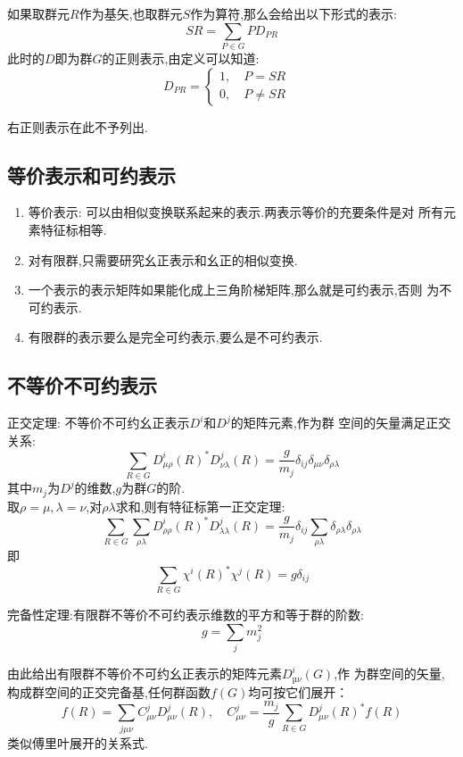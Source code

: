 \documentclass{ctexart}
\begin{document}
\noindent 如果取群元$R$作为基矢,也取群元$S$作为算符,那么会给出以下形式的表示:
\begin{equation}
    SR=\sum_{P\in G}PD_{PR}
\end{equation}
此时的$D$即为群$G$的正则表示,由定义可以知道:
\[
D_{PR}=\begin{cases}
1,\quad P=SR & \\
0,\quad P\neq SR &
\end{cases}
\]

右正则表示在此不予列出.

\subsection{等价表示和可约表示}

\begin{enumerate}
    \item 等价表示: 可以由相似变换联系起来的表示.两表示等价的充要条件是对
    所有元素特征标相等.
    \item 对有限群,只需要研究幺正表示和幺正的相似变换.
    \item 一个表示的表示矩阵如果能化成上三角阶梯矩阵,那么就是可约表示,否则
    为不可约表示.
    \item 有限群的表示要么是完全可约表示,要么是不可约表示.
\end{enumerate}

\subsection{不等价不可约表示}

\noindent 正交定理: 不等价不可约幺正表示$D^{i}$和$D^{j}$的矩阵元素,作为群
空间的矢量满足正交关系:
\[
\sum_{R\in G}D^{i}_{\mu\rho}(R)^{*}D^{j}_{\nu\lambda}(R)=\frac{g}{m_{j}}\delta_{ij}\delta_{\mu\nu}\delta_{\rho\lambda}
\]
其中$m_{j}$为$D^{j}$的维数,$g$为群$G$的阶.\\
取$\rho=\mu,\lambda=\nu$,对$\rho\lambda$求和,则有特征标第一正交定理:
\[
\sum_{R\in G}\sum_{\rho\lambda}D^{i}_{\rho\rho}(R)^{*}D^{j}_{\lambda\lambda}(R)=\frac{g}{m_{j}}\delta_{ij}\sum_{\rho\lambda}\delta_{\rho\lambda}\delta_{\rho\lambda}
\]
即
\[
\sum_{R\in G}\chi^{i}(R)^{*}\chi^{j}(R)=g\delta_{ij}
\]

\noindent 完备性定理:有限群不等价不可约表示维数的平方和等于群的阶数:
\[
g=\sum_{j}m_{j}^{2}
\]

\noindent 由此给出有限群不等价不可约幺正表示的矩阵元素$D^{i}_{µν}(G)$,作
为群空间的矢量,构成群空间的正交完备基,任何群函数$f(G)$均可按它们展开：
\[
f(R)=\sum_{j\mu\nu}C^{j}_{\mu\nu}D^{j}_{\mu\nu}(R),\quad C^{j}_{\mu\nu}=\frac{m_{j}}{g}\sum_{R\in G}D^{j}_{\mu\nu}(R)^{*}f(R)
\]
类似傅里叶展开的关系式.\medskip
\end{document}
